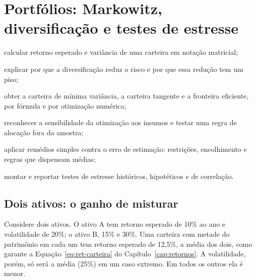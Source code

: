\chapter{Portfólios: Markowitz, diversificação e testes de estresse}
\label{cap:portfolio}


\begin{objetivos}
  \item calcular retorno esperado e variância de uma carteira em notação matricial;
  \item explicar por que a diversificação reduz o risco e por que essa redução tem um piso;
  \item obter a carteira de mínima variância, a carteira tangente e a fronteira eficiente, por fórmula e por otimização numérica;
  \item reconhecer a sensibilidade da otimização aos insumos e testar uma regra de alocação fora da amostra;
  \item aplicar remédios simples contra o erro de estimação: restrições, encolhimento e regras que dispensam médias;
  \item montar e reportar testes de estresse históricos, hipotéticos e de correlação.
\end{objetivos}

\section{Dois ativos: o ganho de misturar}
\label{sec:c08-dois}

Considere dois ativos. O ativo A tem retorno esperado de 10\% ao ano e volatilidade de 20\%; o ativo B, 15\% e 30\%. Uma carteira com metade do patrimônio em cada um tem retorno esperado de 12,5\%, a média dos dois, como garante a Equação~\eqref{eq:ret-carteira} do Capítulo~\ref{cap:retornos}. A volatilidade, porém, só será a média (25\%) em um caso extremo. Em todos os outros ela é menor.

